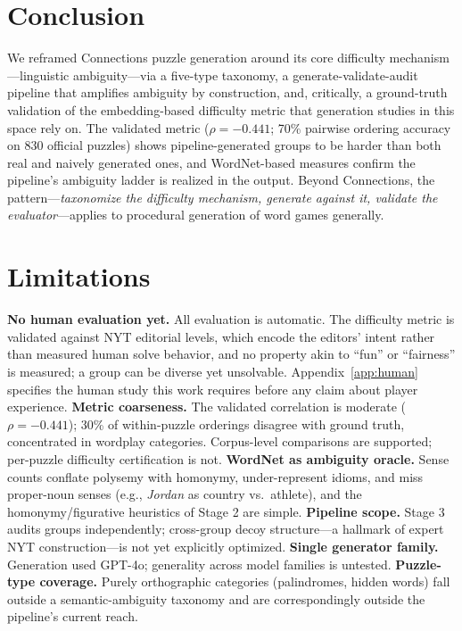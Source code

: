 \documentclass[11pt]{article}
\begin{document}
\section{Conclusion}

We reframed Connections puzzle generation around its core difficulty mechanism---linguistic ambiguity---via a five-type taxonomy, a generate-validate-audit pipeline that amplifies ambiguity by construction, and, critically, a ground-truth validation of the embedding-based difficulty metric that generation studies in this space rely on. The validated metric ($\rho=-0.441$; 70\% pairwise ordering accuracy on 830 official puzzles) shows pipeline-generated groups to be harder than both real and naively generated ones, and WordNet-based measures confirm the pipeline's ambiguity ladder is realized in the output. Beyond Connections, the pattern---\emph{taxonomize the difficulty mechanism, generate against it, validate the evaluator}---applies to procedural generation of word games generally.

\section{Limitations}
\label{sec:limitations}

\textbf{No human evaluation yet.} All evaluation is automatic. The difficulty metric is validated against NYT editorial levels, which encode the editors' intent rather than measured human solve behavior, and no property akin to ``fun'' or ``fairness'' is measured; a group can be diverse yet unsolvable. Appendix~\ref{app:human} specifies the human study this work requires before any claim about player experience.
\textbf{Metric coarseness.} The validated correlation is moderate ($\rho=-0.441$); 30\% of within-puzzle orderings disagree with ground truth, concentrated in wordplay categories. Corpus-level comparisons are supported; per-puzzle difficulty certification is not.
\textbf{WordNet as ambiguity oracle.} Sense counts conflate polysemy with homonymy, under-represent idioms, and miss proper-noun senses (e.g., \emph{Jordan} as country vs.\ athlete), and the homonymy/figurative heuristics of Stage 2 are simple. \textbf{Pipeline scope.} Stage 3 audits groups independently; cross-group decoy structure---a hallmark of expert NYT construction---is not yet explicitly optimized. \textbf{Single generator family.} Generation used GPT-4o; generality across model families is untested. \textbf{Puzzle-type coverage.} Purely orthographic categories (palindromes, hidden words) fall outside a semantic-ambiguity taxonomy and are correspondingly outside the pipeline's current reach.
\end{document}

